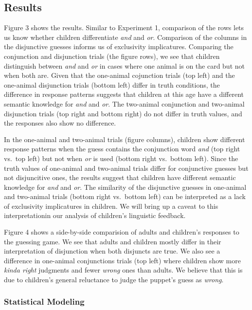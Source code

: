 \documentclass[10pt, letterpaper]{article}
\begin{document}
\subsection{Results}\label{results-1}

Figure 3 shows the results. Similar to Experiment 1, comparison of the
rows lets us know whether children differentiate \emph{and} and
\emph{or}. Comparison of the columns in the disjunctive guesses informs
us of exclusivity implicatures. Comparing the conjunction and
disjunction trials (the figure rows), we see that children distinguish
between \emph{and} and \emph{or} in cases where one animal is on the
card but not when both are. Given that the one-animal cojunction trials
(top left) and the one-animal disjunction trials (bottom left) differ in
truth conditions, the difference in response patterns suggests that
children at this age have a different semantic knowledge for \emph{and}
and \emph{or}. The two-animal conjunction and two-animal disjunction
trials (top right and bottom right) do not differ in truth values, and
the responses also show no difference.

In the one-animal and two-animal trials (figure columns), children show
different response patterns when the guess contains the conjunction word
\emph{and} (top right vs.~top left) but not when \emph{or} is used
(bottom right vs.~bottom left). Since the truth values of one-animal and
two-animal trials differ for conjunctive guesses but not disjuncitive
ones, the results suggest that children have different semantic
knowledge for \emph{and} and \emph{or}. The similarity of the
disjunctive guesses in one-animal and two-animal trials (bottom right
vs.~bottom left) can be interpreted as a lack of exclusivity
implicatures in children. We will bring up a caveat to this
interpretationin our analysis of children's linguistic feedback.

Figure 4 shows a side-by-side comparision of adults and children's
responses to the guessing game. We see that adults and children mostly
differ in their interpretation of disjunction when both disjuncts are
true. We also see a difference in one-animal conjunctions trials (top
left) where children show more \emph{kinda right} judgments and fewer
\emph{wrong} ones than adults. We believe that this is due to children's
general reluctance to judge the puppet's guess as \emph{wrong}.

\subsubsection{Statistical Modeling}\label{statistical-modeling}
\end{document}
